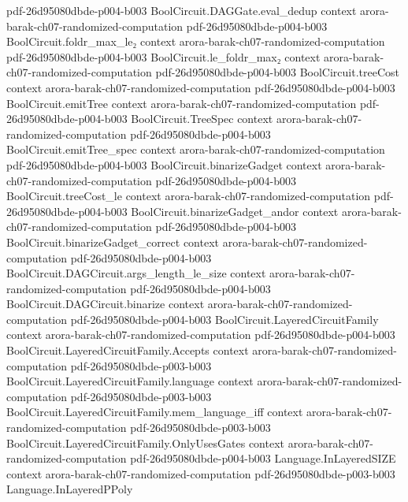 \begin{theorem}
  {pdf-26d95080dbde-p004-b003}
\proofstep
  {BoolCircuit.DAGGate.eval_dedup}
  {context}
  {arora-barak-ch07-randomized-computation}
  {pdf-26d95080dbde-p004-b003}
\proofstep
  {BoolCircuit.foldr_max_le₂}
  {context}
  {arora-barak-ch07-randomized-computation}
  {pdf-26d95080dbde-p004-b003}
\proofstep
  {BoolCircuit.le_foldr_max₂}
  {context}
  {arora-barak-ch07-randomized-computation}
  {pdf-26d95080dbde-p004-b003}
\proofstep
  {BoolCircuit.treeCost}
  {context}
  {arora-barak-ch07-randomized-computation}
  {pdf-26d95080dbde-p004-b003}
\proofstep
  {BoolCircuit.emitTree}
  {context}
  {arora-barak-ch07-randomized-computation}
  {pdf-26d95080dbde-p004-b003}
\proofstep
  {BoolCircuit.TreeSpec}
  {context}
  {arora-barak-ch07-randomized-computation}
  {pdf-26d95080dbde-p004-b003}
\proofstep
  {BoolCircuit.emitTree_spec}
  {context}
  {arora-barak-ch07-randomized-computation}
  {pdf-26d95080dbde-p004-b003}
\proofstep
  {BoolCircuit.binarizeGadget}
  {context}
  {arora-barak-ch07-randomized-computation}
  {pdf-26d95080dbde-p004-b003}
\proofstep
  {BoolCircuit.treeCost_le}
  {context}
  {arora-barak-ch07-randomized-computation}
  {pdf-26d95080dbde-p004-b003}
\proofstep
  {BoolCircuit.binarizeGadget_andor}
  {context}
  {arora-barak-ch07-randomized-computation}
  {pdf-26d95080dbde-p004-b003}
\proofstep
  {BoolCircuit.binarizeGadget_correct}
  {context}
  {arora-barak-ch07-randomized-computation}
  {pdf-26d95080dbde-p004-b003}
\proofstep
  {BoolCircuit.DAGCircuit.args_length_le_size}
  {context}
  {arora-barak-ch07-randomized-computation}
  {pdf-26d95080dbde-p004-b003}
\proofstep
  {BoolCircuit.DAGCircuit.binarize}
  {context}
  {arora-barak-ch07-randomized-computation}
  {pdf-26d95080dbde-p004-b003}
\proofstep
  {BoolCircuit.LayeredCircuitFamily}
  {context}
  {arora-barak-ch07-randomized-computation}
  {pdf-26d95080dbde-p004-b003}
\proofstep
  {BoolCircuit.LayeredCircuitFamily.Accepts}
  {context}
  {arora-barak-ch07-randomized-computation}
  {pdf-26d95080dbde-p003-b003}
\proofstep
  {BoolCircuit.LayeredCircuitFamily.language}
  {context}
  {arora-barak-ch07-randomized-computation}
  {pdf-26d95080dbde-p003-b003}
\proofstep
  {BoolCircuit.LayeredCircuitFamily.mem_language_iff}
  {context}
  {arora-barak-ch07-randomized-computation}
  {pdf-26d95080dbde-p003-b003}
\proofstep
  {BoolCircuit.LayeredCircuitFamily.OnlyUsesGates}
  {context}
  {arora-barak-ch07-randomized-computation}
  {pdf-26d95080dbde-p004-b003}
\proofstep
  {Language.InLayeredSIZE}
  {context}
  {arora-barak-ch07-randomized-computation}
  {pdf-26d95080dbde-p003-b003}
\proofstep
  {Language.InLayeredPPoly}

\end{theorem}
